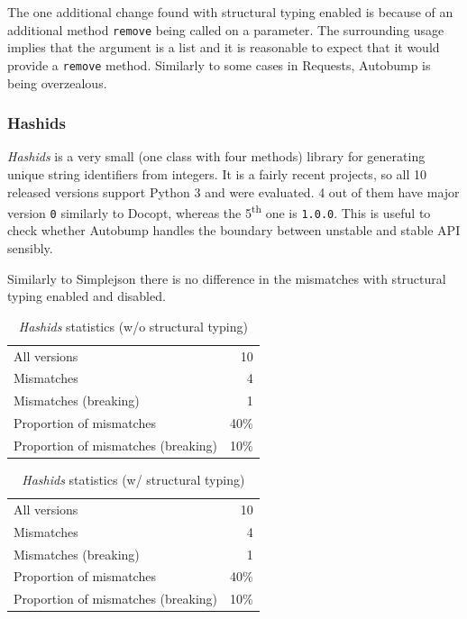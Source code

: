\documentclass{l4proj}
\newcommand\genericstyle{\lstset{basicstyle=\ttm}}
\newcommand\codeinline[1]{{\genericstyle\lstinline!#1!}}
\begin{document}
The one additional change found with structural typing enabled is
because of an additional method \codeinline{remove} being called on a
parameter. The surrounding usage implies that the argument is a list
and it is reasonable to expect that it would provide a
\codeinline{remove} method. Similarly to some cases in
Requests, Autobump is being overzealous.

\subsubsection{Hashids}

\textit{Hashids} is a very small (one class with four methods) library
for generating unique string identifiers from integers. It is a fairly
recent projects, so all 10 released versions support Python 3 and were
evaluated. 4 out of them have major version \codeinline{0} similarly
to Docopt, whereas the 5\textsuperscript{th} one is
\codeinline{1.0.0}. This is useful to check whether Autobump handles
the boundary between unstable and stable API sensibly.

Similarly to Simplejson there is no difference in the
mismatches with structural typing enabled and disabled.

\noindent
\begin{minipage}[t]{0.5\textwidth}
\begin{table}[H]
\centering
\begin{tabular}{|lr|}
All versions & 10 \\
Mismatches & 4 \\
Mismatches (breaking) & 1 \\
Proportion of mismatches & 40\% \\
Proportion of mismatches (breaking) & 10\% \\
\end{tabular}
\caption{\textit{Hashids} statistics (w/o structural typing)}
\label{HashidsNonStructural}
\end{table}
\end{minipage}
\begin{minipage}[t]{0.5\textwidth}
\begin{table}[H]
\centering
\begin{tabular}{|lr|}
All versions & 10 \\
Mismatches & 4 \\
Mismatches (breaking) & 1 \\
Proportion of mismatches & 40\% \\
Proportion of mismatches (breaking) & 10\% \\
\end{tabular}
\caption{\textit{Hashids} statistics (w/ structural typing)}
\label{HashidsStructural}
\end{table}
\end{minipage}
\end{document}
